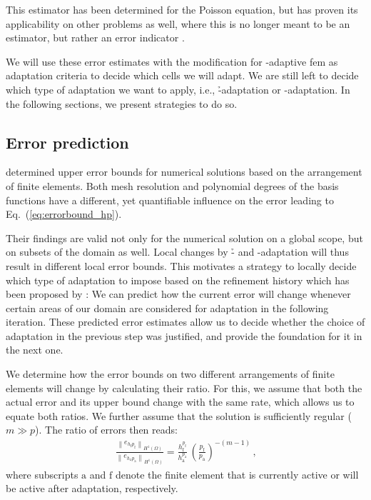 This estimator has been determined for the Poisson equation, but has proven its applicability on other problems as well, where this is no longer meant to be an estimator, but rather an error indicator \cite{dealiikelly}.

We will use these error estimates with the modification for \hp-adaptive \gls{fem} as adaptation criteria to decide which cells we will adapt. We are still left to decide which type of adaptation we want to apply, i.e., \h-adaptation or \p-adaptation. In the following sections, we present strategies to do so.



\subsection{Error prediction}
\label{ssec:prediction}

\textcite{babuska1990} determined upper error bounds for numerical solutions based on the arrangement of finite elements. Both mesh resolution and polynomial degrees of the basis functions have a different, yet quantifiable influence on the error leading to Eq.~(\ref{eq:errorbound_hp}).

Their findings are valid not only for the numerical solution on a global scope, but on subsets of the domain as well. Local changes by \h- and \p-adaptation will thus result in different local error bounds. This motivates a strategy to locally decide which type of adaptation to impose based on the refinement history which has been proposed by \textcite{melenk2001}: We can predict how the current error will change whenever certain areas of our domain are considered for adaptation in the following iteration. These predicted error estimates allow us to decide whether the choice of adaptation in the previous step was justified, and provide the foundation for it in the next one.

We determine how the error bounds on two different arrangements of finite elements will change by calculating their ratio. For this, we assume that both the actual error and its upper bound change with the same rate, which allows us to equate both ratios. We further assume that the solution is sufficiently regular ($m \gg p$). The ratio of errors then reads:
\begin{align}
\label{eq:errorratio_hp} \frac{\left\|e_{h_\text{f} p_\text{f}}\right\|_{H^{1}(\Omega)}}{\left\|e_{h_\text{a} p_\text{a}}\right\|_{H^{1}(\Omega)}} = \frac{h_\text{f}^{p_\text{f}}}{h_\text{a}^{p_\text{a}}} \, \left(\frac{p_\text{f}}{p_\text{a}}\right)^{-(m-1)} \,\text{,}
\end{align}
where subscripts $\text{a}$ and $\text{f}$ denote the finite element that is currently active or will be active after adaptation, respectively.


